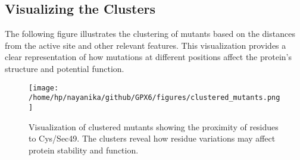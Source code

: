 \documentclass{article}
\begin{document}
\subsection{Visualizing the Clusters}

The following figure illustrates the clustering of mutants based on the distances from the active site and other relevant features. This visualization provides a clear representation of how mutations at different positions affect the protein’s structure and potential function.

\begin{figure}[h!]
    \centering
    \texttt{[image: /home/hp/nayanika/github/GPX6/figures/clustered\_mutants.png]} %
    \caption{Visualization of clustered mutants showing the proximity of residues to Cys/Sec49. The clusters reveal how residue variations may affect protein stability and function.}
    \label{fig:clustered_mutants}
\end{figure}
\end{document}

